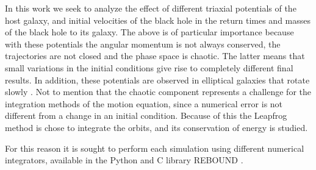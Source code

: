 	In this work we seek to analyze the effect of different triaxial potentials of the host galaxy, and initial velocities of the black hole in the return times and masses of the black hole to its galaxy. The above is of particular importance because with these potentials the angular momentum is not always conserved, the trajectories are not closed and the phase space is chaotic. The latter means that small variations in the initial conditions give rise to completely different final results. In addition, these potentials are observed in elliptical galaxies that rotate slowly \cite{buote2002chandra, binney1978elliptical}. Not to mention that the chaotic component represents a challenge for the integration methods of the motion equation, since a numerical error is not different from a change in an initial condition. Because of this the Leapfrog method is chose to integrate the orbits, and its conservation of energy is studied.
	
	For this reason it is sought to perform each simulation using different numerical integrators, available in the Python and C library REBOUND \cite{larson2017modeling}.
